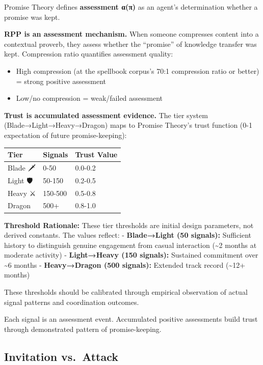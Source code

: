 \documentclass[
  11pt,
]{article}
\newcounter{none} %
\providecommand{\tightlist}{%
  \setlength{\itemsep}{0pt}\setlength{\parskip}{0pt}}
\begin{document}
Promise Theory defines \textbf{assessment α(π)} as an agent's
determination whether a promise was kept.

\textbf{RPP is an assessment mechanism.} When someone compresses content
into a contextual proverb, they assess whether the ``promise'' of
knowledge transfer was kept. Compression ratio quantifies assessment
quality:

\begin{itemize}
\tightlist
\item
  High compression (at the spellbook corpus's 70:1 compression ratio or
  better) = strong positive assessment
\item
  Low/no compression = weak/failed assessment
\end{itemize}

\textbf{Trust is accumulated assessment evidence.} The tier system
(Blade→Light→Heavy→Dragon) maps to Promise Theory's trust function (0-1
expectation of future promise-keeping):

{\def\LTcaptype{none} %
\begin{longtable}[]{@{}lll@{}}
\toprule\noalign{}
Tier & Signals & Trust Value \\
\midrule\noalign{}
\endhead
\bottomrule\noalign{}
\endlastfoot
Blade 🗡️ & 0-50 & 0.0-0.2 \\
Light 🛡️ & 50-150 & 0.2-0.5 \\
Heavy ⚔️ & 150-500 & 0.5-0.8 \\
Dragon 🐉 & 500+ & 0.8-1.0 \\
\end{longtable}
}

\textbf{Threshold Rationale:} These tier thresholds are initial design
parameters, not derived constants. The values reflect: -
\textbf{Blade→Light (50 signals):} Sufficient history to distinguish
genuine engagement from casual interaction (\textasciitilde2 months at
moderate activity) - \textbf{Light→Heavy (150 signals):} Sustained
commitment over \textasciitilde6 months - \textbf{Heavy→Dragon (500
signals):} Extended track record (\textasciitilde12+ months)

These thresholds should be calibrated through empirical observation of
actual signal patterns and coordination outcomes.

Each signal is an assessment event. Accumulated positive assessments
build trust through demonstrated pattern of promise-keeping.

\subsection{Invitation vs.~Attack}\label{invitation-vs.-attack}
\end{document}
